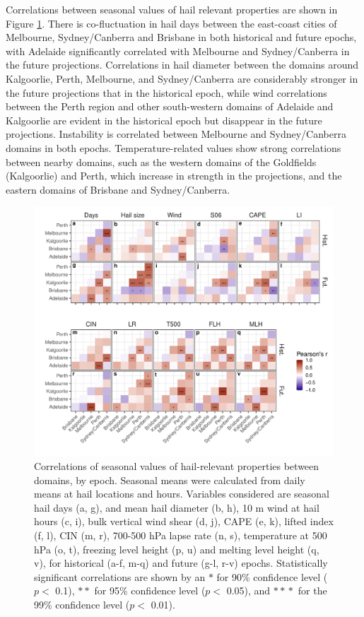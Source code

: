 \documentclass[]{agujournal2019}\usepackage[]{graphicx}\usepackage[]{xcolor}
\begin{document}
Correlations between seasonal values of hail relevant properties are shown in Figure \ref{fig:correlations}. There is co-fluctuation in hail days between the east-coast cities of Melbourne, Sydney/Canberra and Brisbane in both historical and future epochs, with Adelaide significantly correlated with Melbourne and Sydney/Canberra in the future projections. Correlations in hail diameter between the domains around Kalgoorlie, Perth, Melbourne, and Sydney/Canberra are considerably stronger in the future projections that in the historical epoch, while wind correlations between the Perth region and other south-western domains of Adelaide and Kalgoorlie are evident in the historical epoch but disappear in the future projections. Instability is correlated between Melbourne and Sydney/Canberra domains in both epochs. Temperature-related values show strong correlations between nearby domains, such as the western domains of the Goldfields (Kalgoorlie) and Perth, which increase in strength in the projections, and the eastern domains of Brisbane and Sydney/Canberra.

\begin{figure}[!ht]
      \includegraphics[width=\textwidth]{figures/correlations}
      \caption{Correlations of seasonal values of hail-relevant properties between domains, by epoch. Seasonal means were calculated from daily means at hail locations and hours. Variables considered are seasonal hail days (a, g), and mean hail diameter (b, h), 10 m wind at hail hours (c, i), bulk vertical wind shear (d, j), CAPE (e, k), lifted index (f, l), CIN (m, r), 700-500 hPa lapse rate (n, s), temperature at 500 hPa (o, t), freezing level height (p, u) and melting level height (q, v), for historical (a-f, m-q) and future (g-l, r-v) epochs. Statistically significant correlations are shown by an $\ast{}$ for 90\% confidence level ($p <$ 0.1), $\ast{}\!\ast{}$ for 95\% confidence level ($p <$ 0.05), and $\ast{}\!\ast{}\!\!\ast{}$ for the 99\% confidence level ($p <$ 0.01).}
      \label{fig:correlations}
\end{figure}
\end{document}
